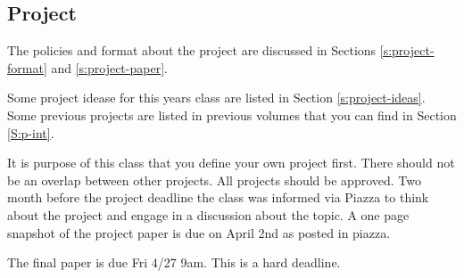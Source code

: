 \subsection{Project}
\label{E:project}

\begin{exercise} 

The policies and format about the project are discussed in Sections
\ref{s:project-format} and
\ref{s:project-paper}.

Some project idease for this years class are listed in Section
\ref{s:project-ideas}. Some previous projects are listed in previous
volumes that you can find in Section \ref{S:p-int}.

It is purpose of this class that you define your own project
first. There should not be an overlap between other projects. All
projects should be approved.  Two month before the project deadline
the class was informed via Piazza to think about the project and
engage in a discussion about the topic. A one page snapshot of the
project paper is due on April 2nd as posted in piazza.

The final paper is due Fri 4/27 9am. This is a hard deadline.

\end{exercise} 

